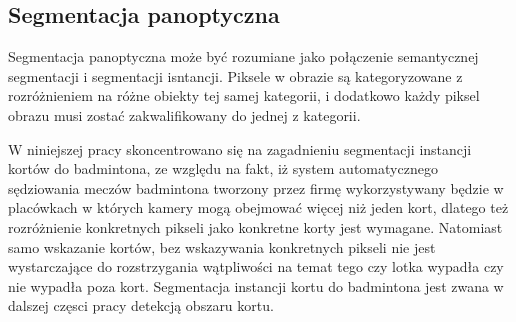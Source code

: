 \subsection*{Segmentacja panoptyczna}
Segmentacja panoptyczna może być rozumiane jako połączenie semantycznej segmentacji i segmentacji isntancji. Piksele w obrazie są kategoryzowane z rozróżnieniem na różne obiekty tej samej kategorii, i dodatkowo każdy piksel obrazu musi zostać zakwalifikowany do jednej z kategorii.

\vspace{0.5cm}

W niniejszej pracy skoncentrowano się na zagadnieniu segmentacji instancji kortów do badmintona, ze względu na fakt, iż system automatycznego sędziowania meczów badmintona tworzony przez firmę \blue{} wykorzystywany będzie w placówkach w których kamery mogą obejmować więcej niż jeden kort, dlatego też rozróżnienie konkretnych pikseli jako konkretne korty jest wymagane. Natomiast samo wskazanie kortów, bez wskazywania konkretnych pikseli nie jest wystarczające do rozstrzygania wątpliwości na temat tego czy lotka wypadła czy nie wypadła poza kort. Segmentacja instancji kortu do badmintona jest zwana w dalszej częsci pracy detekcją obszaru kortu.
